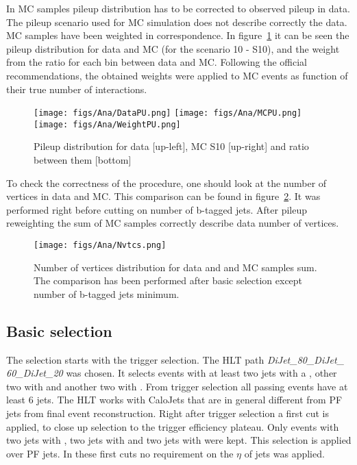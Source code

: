 In MC samples pileup distribution has to be corrected to observed pileup in data. The pileup scenario used for MC simulation does not describe correctly the data. MC samples have been weighted in correspondence. In figure~\ref{fig:PU_distros} it can be seen the pileup distribution for data and MC (for the scenario 10 - S10), and the weight from the ratio for each bin between data and MC. Following the official recommendations, the obtained weights were applied to MC events as function of their true number of interactions.

\begin{figure}[!Hhtbp]
  \begin{center}
    \texttt{[image: figs/Ana/DataPU.png]}
    \texttt{[image: figs/Ana/MCPU.png]}
    \texttt{[image: figs/Ana/WeightPU.png]}
    \caption{Pileup distribution for data [up-left], MC S10 [up-right] and ratio between them [bottom]}
    \label{fig:PU_distros}
  \end{center}
\end{figure}

To check the correctness of the procedure, one should look at the number of vertices in data and MC. This comparison can be found in figure~\ref{fig:NV_dataMC}. It was performed right before cutting on number of b-tagged jets. After pileup reweighting the sum of MC samples correctly describe data number of vertices.

\begin{figure}[!Hhtbp]
  \begin{center}
    \texttt{[image: figs/Ana/Nvtcs.png]}
    \caption{Number of vertices distribution for data and and MC samples sum. The comparison has been performed after basic selection except number of b-tagged jets minimum.}
    \label{fig:NV_dataMC}
  \end{center}
\end{figure}

\subsection{Basic selection}

The selection starts with the trigger selection. The HLT path \textit{DiJet\_80\_DiJet\_\\60\_DiJet\_20} was chosen. It selects events with at least two jets with a , other two with  and another two with . From trigger selection all passing events have at least 6 jets. The HLT works with CaloJets that are in general different from PF jets from final event reconstruction. Right after trigger selection a first cut is applied, to close up selection to the trigger efficiency plateau. Only events with two jets with , two jets with  and two jets with  were kept. This selection is applied over PF jets. In these first cuts no requirement on the $\eta$ of jets was applied.


